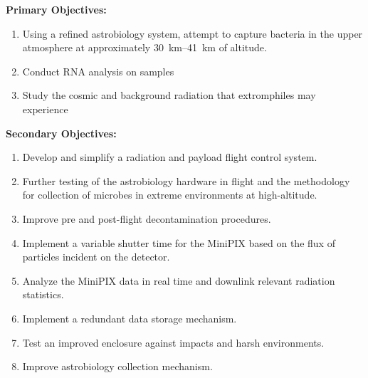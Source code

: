 

{\bf Primary Objectives:}
	\begin{enumerate}
	\item Using a refined astrobiology system, attempt to capture bacteria in the upper atmosphere at approximately \SIrange{30}{41}{\kilo\meter} of altitude.
%	
%
	\item Conduct RNA analysis on samples
	\item Study the cosmic and background radiation that extromphiles may experience
	\end{enumerate}
%
%
{\bf Secondary Objectives:}
\begin{enumerate}
	\item Develop and simplify a radiation and payload flight control system.
	\item Further testing of the astrobiology hardware in flight and the methodology for collection of microbes in extreme environments at high-altitude. 
	\item Improve pre and post-flight decontamination procedures.
	\item Implement a variable shutter time for the MiniPIX based on the flux of particles incident on the detector.
	\item Analyze the MiniPIX data in real time and downlink relevant radiation statistics.
	\item Implement a redundant data storage mechanism.
	\item Test an improved enclosure against impacts and harsh environments.
	\item Improve astrobiology collection mechanism.
\end{enumerate}
